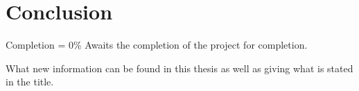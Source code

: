 \chapter{Conclusion}

Completion = 0\%
Awaits the completion of the project for completion.

What new information can be found in this thesis as well as giving what is stated in the title.